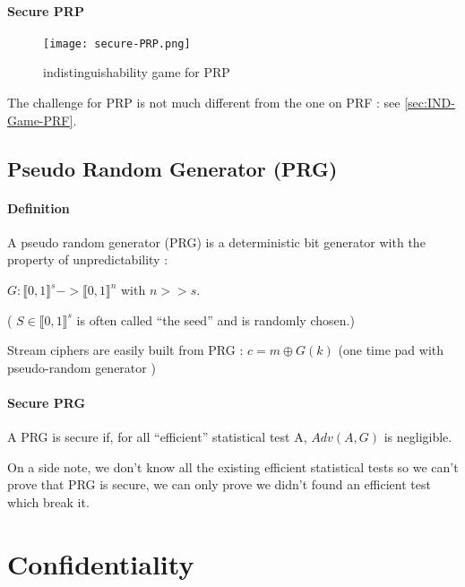 \paragraph{Secure PRP \\}


\begin{figure}[ht!]
	\centering
		\texttt{[image: secure-PRP.png]}
	\caption{indistinguishability game for PRP}
	\label{fig:IND-Game-PRP}
\end{figure}

The challenge for PRP is not much different from the one on PRF : see \ref{sec:IND-Game-PRF}.

\subsection{Pseudo Random Generator     (PRG)} 


\paragraph{Definition \\}

A pseudo random generator (PRG) is a deterministic bit generator with the property of  unpredictability :
\begin{mydef}
$ G : \llbracket  0,1 \rrbracket ^s -> \llbracket  0,1 \rrbracket ^n $  with  $n>>s$. 

\small	( $S \in \llbracket  0,1 \rrbracket ^s$ is often called ``the seed'' and is randomly chosen.) 

\end{mydef}

Stream ciphers are easily built from PRG : $c = m \oplus G(k) $  (one time pad with pseudo-random generator )


\paragraph{Secure PRG \\}
A PRG is secure if, for all ``efficient'' statistical test A, $Adv(A,G)$ is negligible.

On a side note, we don't know all the existing efficient statistical tests so we can't prove that PRG is secure, we can only prove we didn't found an efficient test which break it.


\section{Confidentiality}
